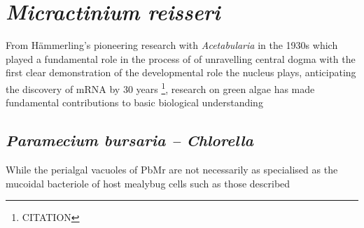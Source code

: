 %
%
%
%
%


\section{\textit{Micractinium reisseri}}
From H\"ammerling's pioneering research with \textit{Acetabularia} in the 1930s 
which played a fundamental role in the process of 
of unravelling central dogma with the first clear demonstration of the 
developmental role the nucleus plays, anticipating the discovery of mRNA by 30 years
\footnote{CITATION}, research on green algae has made fundamental contributions
to basic biological understanding

\subsection{\textit{Paramecium bursaria – Chlorella}}

While the perialgal vacuoles of PbMr are not necessarily as specialised as the 
mucoidal bacteriole of host mealybug cells such as those described \citep{vonDohlen2001}

